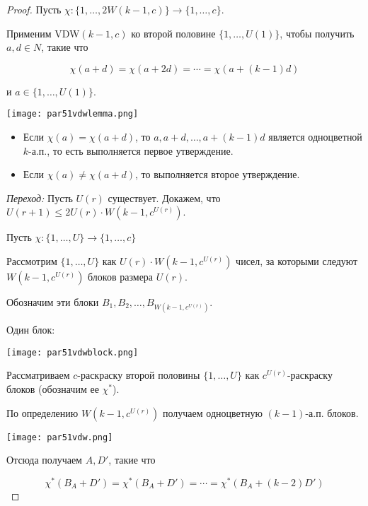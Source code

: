 \begin{normalsize}
\begin{proof}
    Пусть $\chi: \{1, \ldots, 2W(k-1, c)\} \to \{1, \ldots, c\}$.

    Применим VDW$(k - 1, c)$ ко второй половине $\{1, \ldots, U(1)\}$, чтобы получить $a, d \in N$, такие что 

    \[ \chi(a + d) = \chi(a + 2d) = \cdots = \chi(a + (k - 1)d) \]

    и $a \in \{1, \ldots, U(1)\}$.

    \begin{center}
        \texttt{[image: par51vdwlemma.png]}
    \end{center}

    \begin{itemize}
        \item Если $\chi(a) = \chi(a + d)$, то $a, a + d, \ldots, a + (k - 1)d$ является одноцветной $k$-а.п., то есть выполняется первое утверждение.
        
        \item Если $\chi(a) \neq \chi(a + d)$, то выполняется второе утверждение.
    \end{itemize}
    
    \textsl{Переход:} Пусть $U(r)$ существует. Докажем, что $U(r + 1) \leq 2U(r) \cdot W(k - 1, c^{U(r)})$.

    Пусть $\chi: \{1, \ldots, U\} \to \{1, \ldots, c\}$

    Рассмотрим $\{1, \ldots, U\}$ как $U(r) \cdot W(k - 1, c^{U(r)})$ чисел, за которыми следуют $W(k - 1, c^{U(r)})$ блоков размера $U(r)$.

    Обозначим эти блоки $B_1, B_2, \ldots, B_{W(k - 1, c^{U(r)})}$.

    Один блок:

    \begin{center}
        \texttt{[image: par51vdwblock.png]}
    \end{center}

    Рассматриваем $c$-раскраску второй половины $\{1, \ldots, U\}$ как $c^{U(r)}$-раскраску блоков (обозначим ее $\chi^*$).

    По определению $W(k - 1, c^{U(r)})$ получаем одноцветную $(k - 1)$-а.п. блоков.

    \begin{center}
        \texttt{[image: par51vdw.png]}
    \end{center}

    Отсюда получаем $A, D'$, такие что

    \[ \chi^*(B_A + D') = \chi^*(B_A + D') = \cdots = \chi^*(B_A + (k - 2)D') \]


\end{proof}
\end{normalsize}
